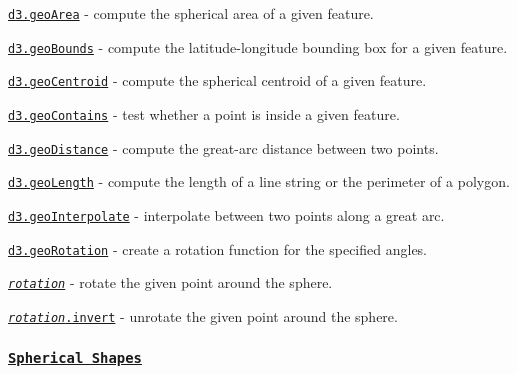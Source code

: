 \begin{DoxyItemize}
\item \href{https://github.com/d3/d3-geo/blob/master/README.md#geoArea}{\tt d3.\+geo\+Area} -\/ compute the spherical area of a given feature.
\item \href{https://github.com/d3/d3-geo/blob/master/README.md#geoBounds}{\tt d3.\+geo\+Bounds} -\/ compute the latitude-\/longitude bounding box for a given feature.
\item \href{https://github.com/d3/d3-geo/blob/master/README.md#geoCentroid}{\tt d3.\+geo\+Centroid} -\/ compute the spherical centroid of a given feature.
\item \href{https://github.com/d3/d3-geo/blob/master/README.md#geoContains}{\tt d3.\+geo\+Contains} -\/ test whether a point is inside a given feature.
\item \href{https://github.com/d3/d3-geo/blob/master/README.md#geoDistance}{\tt d3.\+geo\+Distance} -\/ compute the great-\/arc distance between two points.
\item \href{https://github.com/d3/d3-geo/blob/master/README.md#geoLength}{\tt d3.\+geo\+Length} -\/ compute the length of a line string or the perimeter of a polygon.
\item \href{https://github.com/d3/d3-geo/blob/master/README.md#geoInterpolate}{\tt d3.\+geo\+Interpolate} -\/ interpolate between two points along a great arc.
\item \href{https://github.com/d3/d3-geo/blob/master/README.md#geoRotation}{\tt d3.\+geo\+Rotation} -\/ create a rotation function for the specified angles.
\item \href{https://github.com/d3/d3-geo/blob/master/README.md#_rotation}{\tt {\itshape rotation}} -\/ rotate the given point around the sphere.
\item \href{https://github.com/d3/d3-geo/blob/master/README.md#rotation_invert}{\tt {\itshape rotation}.invert} -\/ unrotate the given point around the sphere.
\end{DoxyItemize}

\subsubsection*{\href{https://github.com/d3/d3-geo/blob/master/README.md#spherical-shapes}{\tt Spherical Shapes}}


